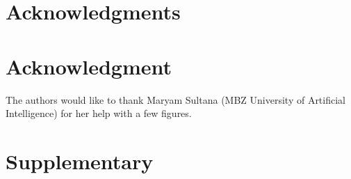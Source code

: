 \documentclass[10pt,journal,compsoc]{IEEEtran}
\begin{document}
\ifCLASSOPTIONcompsoc
  \section*{Acknowledgments}
\else
  \section*{Acknowledgment}
\fi
{\footnotesize The authors would like to thank Maryam Sultana (MBZ University of Artificial Intelligence) for her help with a few figures.}





\iffalse
\clearpage
\onecolumn

\section{Supplementary}
\end{document}
